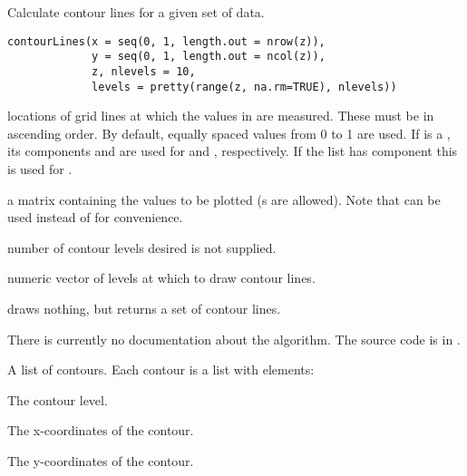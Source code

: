 %
\begin{Description}\relax
Calculate contour lines for a given set of data.
\end{Description}
%
\begin{Usage}
\begin{verbatim}
contourLines(x = seq(0, 1, length.out = nrow(z)),
             y = seq(0, 1, length.out = ncol(z)),
             z, nlevels = 10,
             levels = pretty(range(z, na.rm=TRUE), nlevels))
\end{verbatim}
\end{Usage}
%
\begin{Arguments}
\begin{ldescription}
\item[\code{x,y}] locations of grid lines at which the values in  are
measured.  These must be in ascending order.  By default, equally
spaced values from 0 to 1 are used.  If  is a ,
its components  and  are used for 
and , respectively. If the list has component  this
is used for .
\item[\code{z}] a matrix containing the values to be plotted (s are
allowed).  Note that  can be used instead of  for
convenience.
\item[\code{nlevels}] number of contour levels desired 
 is not supplied.
\item[\code{levels}] numeric vector of levels at which to draw contour
lines.
\end{ldescription}
\end{Arguments}
%
\begin{Details}\relax
{} draws nothing, but returns a set of contour lines.

There is currently no documentation about the algorithm.
The source code is in .
\end{Details}
%
\begin{Value}
A list of contours.
Each contour is a list with elements:
\begin{ldescription}
\item[\code{level }] The contour level.
\item[\code{x }] The x-coordinates of the contour.
\item[\code{y }] The y-coordinates of the contour.
\end{ldescription}
\end{Value}
